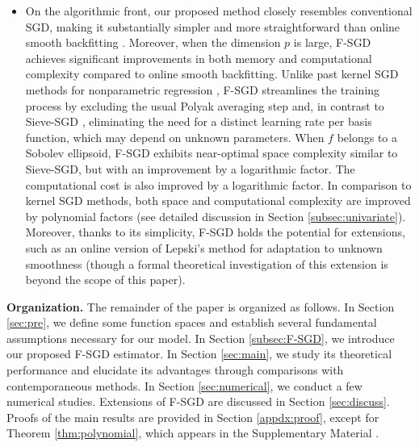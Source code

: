 \begin{itemize}
\item On the algorithmic front, our proposed method closely resembles conventional 
SGD, making it substantially simpler and more straightforward than online 
smooth backfitting \citep{yang2023online}. Moreover, when the dimension $p$ is large, F-SGD achieves 
significant improvements in both memory and computational complexity compared 
to online smooth backfitting.  Unlike past kernel SGD methods for nonparametric regression \citep{zhang2022sieve,4406a3ce-1e59-3ed8-8c25-9f7d75b81f14}, F-SGD streamlines the training process by excluding the usual Polyak averaging step and, in contrast to Sieve-SGD \citep{zhang2022sieve}, eliminating the need for a distinct learning rate per basis function, which may depend on unknown parameters.  When $f$ belongs to a Sobolev ellipsoid, F-SGD exhibits near-optimal space complexity similar to Sieve-SGD, but with an improvement by a logarithmic factor. The computational cost is also improved by a logarithmic factor. In comparison to kernel SGD methods, both space and computational complexity are improved by polynomial factors (see detailed discussion in Section \ref{subsec:univariate}). Moreover, thanks to its simplicity, F-SGD holds the potential for extensions, such as an online version of Lepski's method for adaptation to unknown smoothness (though a formal theoretical investigation of this extension is beyond the scope of this paper).

\end{itemize}

\noindent\textbf{Organization.} The remainder of the paper is organized as follows. In Section \ref{sec:pre}, we define some function spaces and establish several fundamental assumptions necessary for our model. In Section \ref{subsec:F-SGD}, we introduce our proposed F-SGD estimator. In Section \ref{sec:main}, we study its theoretical performance and elucidate its advantages through comparisons with contemporaneous methods. In Section \ref{sec:numerical}, we conduct a few numerical studies. Extensions of F-SGD are discussed in Section \ref{sec:discuss}. Proofs of the main results are provided in Section \ref{appdx:proof}, except for Theorem \ref{thm:polynomial}, which appears in the Supplementary Material \citep{chen2025supplement}.

